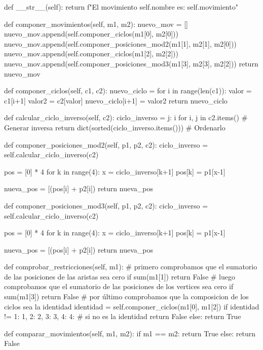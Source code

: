     def __str__(self):
        return f"El movimiento {self.nombre} es: {self.movimiento}"
    
    def componer_movimientos(self, m1, m2):
        nuevo_mov = []
        nuevo_mov.append(self.componer_ciclos(m1[0], m2[0]))
        nuevo_mov.append(self.componer_posiciones_mod2(m1[1], m2[1], m2[0]))
        nuevo_mov.append(self.componer_ciclos(m1[2], m2[2]))
        nuevo_mov.append(self.componer_posiciones_mod3(m1[3], m2[3], m2[2]))
        return nuevo_mov
        
    def componer_ciclos(self, c1, c2):
        nuevo_ciclo = {}
        for i in range(len(c1)):
            valor = c1[i+1]
            valor2 = c2[valor]
            nuevo_ciclo[i+1] = valor2
        return nuevo_ciclo
    
    def calcular_ciclo_inverso(self, c2):
        ciclo_inverso = {j: i for i, j in c2.items()}  # Generar inversa
        return dict(sorted(ciclo_inverso.items()))  # Ordenarlo
    
    def componer_posiciones_mod2(self, p1, p2, c2):
        ciclo_inverso = self.calcular_ciclo_inverso(c2)

        pos = [0] * 4
        for k in range(4):
            x = ciclo_inverso[k+1]
            pos[k] = p1[x-1]

        nueva_pos = [(pos[i] + p2[i]) %
        return nueva_pos

    def componer_posiciones_mod3(self, p1, p2, c2):
        ciclo_inverso = self.calcular_ciclo_inverso(c2)

        pos = [0] * 4
        for k in range(4):
            x = ciclo_inverso[k+1]
            pos[k] = p1[x-1]

        nueva_pos = [(pos[i] + p2[i]) %
        return nueva_pos
    
    def comprobar_restricciones(self, m1):
        # primero comprobamos que el sumatorio de las posiciones de las aristas sea cero
        if sum(m1[1]) %
            return False
        # luego comprobamos que el sumatorio de las posiciones de los vertices sea cero
        if sum(m1[3]) %
            return False
        # por último comprobamos que la composicion de los ciclos sea la identidad
        identidad = self.componer_ciclos(m1[0], m1[2])
        if identidad != {1: 1, 2: 2, 3: 3, 4: 4}:  # si no es la identidad
            return False
        else:
            return True
        
    def comparar_movimientos(self, m1, m2):
        if m1 == m2:
            return True
        else:
            return False


